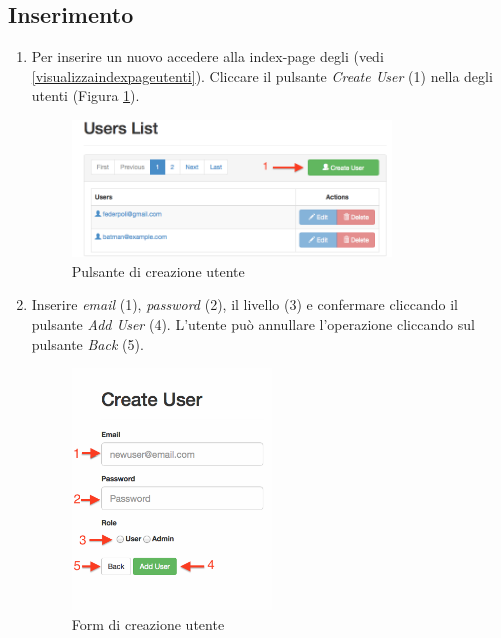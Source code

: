 	\clearpage
	\subsection{Inserimento} %
	\label{utenti-inserimento}
		\begin{enumerate}

			\item Per inserire un nuovo  accedere alla index-page degli  (vedi \ref{visualizzaindexpageutenti}). Cliccare il pulsante \emph{Create User} (1) nella  degli utenti (Figura \ref{fig:createuserButton}).
				\begin{figure}[H]
					\centering \includegraphics[width=0.8\textwidth]{img/createuserButton.png}
					\caption{ \label{fig:createuserButton} Pulsante di creazione utente}
				\end{figure}

			\item Inserire \emph{email} (1), \emph{password} (2), il livello  (3) e confermare cliccando il pulsante \emph{Add User} (4). L'utente può annullare l'operazione cliccando sul pulsante \emph{Back} (5).

				\begin{figure}[H]
					\centering \includegraphics[width=0.5\textwidth]{img/formCreazioneUtente.png}
					\caption{ \label{fig:formCreazioneUtente} Form di creazione utente}
				\end{figure}


\end{enumerate}
